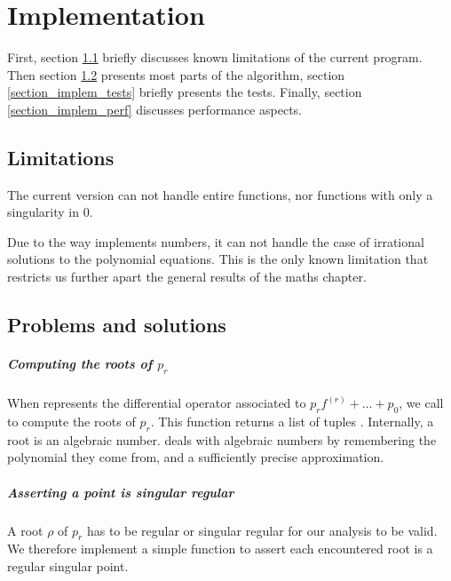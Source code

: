 \documentclass[../main.tex]{subfiles}
\begin{document}
\chapter{Implementation}

First, section \ref{section_limitations} briefly discusses known limitations of the current program. Then section \ref{section_implem_structure} presents most parts of the algorithm, section \ref{section_implem_tests} briefly presents the tests. Finally, section \ref{section_implem_perf} discusses performance aspects.

\section{Limitations}\label{section_limitations}

The current version can not handle entire functions, nor functions with only a singularity in 0.

Due to the way  implements numbers, it can not handle the case of irrational solutions to the polynomial equations. This is the only known limitation that restricts us further apart the general results of the maths chapter.

\section{Problems and solutions}\label{section_implem_structure}

\paragraph{Computing the roots of $p_r$}
When  represents the differential operator associated to $p_r f^(r) + \dots + p_0$, we call  to compute the roots of $p_r$. This function returns a list of tuples . Internally, a root is an algebraic number.  deals with algebraic numbers by remembering the polynomial they come from, and a sufficiently precise approximation.

\paragraph{Asserting a point is singular regular}
A root $\rho$ of $p_r$ has to be regular or singular regular for our analysis to be valid. We therefore implement a simple function to assert each encountered root is a regular singular point.
 
\end{document}
